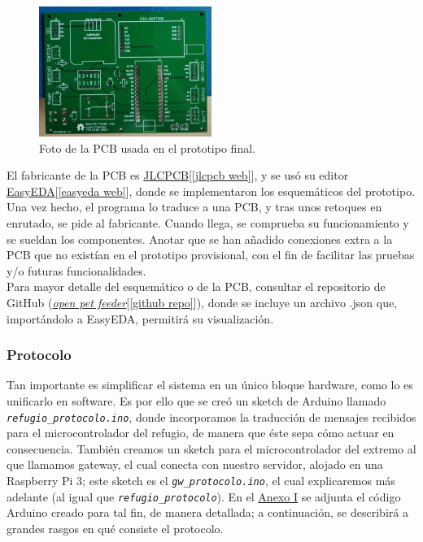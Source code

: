 \documentclass[12pt]{article}
\begin{document}
	\begin{figure}[h]
		\begin{center}
			\includegraphics[width=0.5\textwidth]{img/pcb_v1.1a.png}
			\caption{Foto de la PCB usada en el prototipo final.}
			\label{Foto PCB v1.1a}
		\end{center}
	\end{figure}
	
	\noindent El fabricante de la PCB es \href{https://jlcpcb.com/}{JLCPCB}[\ref{jlcpcb web}], y se usó su editor \href{https://easyeda.com/es}{EasyEDA}[\ref{easyeda web}], donde se implementaron los esquemáticos del prototipo. Una vez hecho, el programa lo traduce a una PCB, y tras unos retoques en enrutado, se pide al fabricante. Cuando llega, se comprueba su funcionamiento y se sueldan los componentes. Anotar que se han añadido conexiones extra a la PCB que no existían en el prototipo provisional, con el fin de facilitar las pruebas y/o futuras funcionalidades.\\
	
	\noindent Para mayor detalle del esquemático o de la PCB, consultar el repositorio de GitHub (\href{https://github.com/ChiaFranfer/open-pet-feeder}{\textit{open pet feeder}}[\ref{github repo}]), donde se incluye un archivo .json que, importándolo a EasyEDA, permitirá su visualización. \\
	
	\subsubsection{Protocolo}
	\label{protocolo explicacion}
	
	\noindent Tan importante es simplificar el sistema en un único bloque hardware, como lo es unificarlo en software. Es por ello que se creó un sketch de Arduino llamado \texttt{\textit{refugio\_protocolo.ino}}, donde incorporamos la traducción de mensajes recibidos para el microcontrolador del refugio, de manera que éste sepa cómo actuar en consecuencia. También creamos un sketch para el microcontrolador del extremo al que llamamos gateway, el cual conecta con nuestro servidor, alojado en una Raspberry Pi 3; este sketch es el \texttt{\textit{gw\_protocolo.ino}}, el cual explicaremos más adelante (al igual que \texttt{\textit{refugio\_protocolo}}).  En el \hyperref[anexo I: codigo]{Anexo I}  se adjunta el código Arduino creado para tal fin, de manera detallada; a continuación, se describirá a grandes rasgos en qué consiste el protocolo.\\
	
\end{document}
